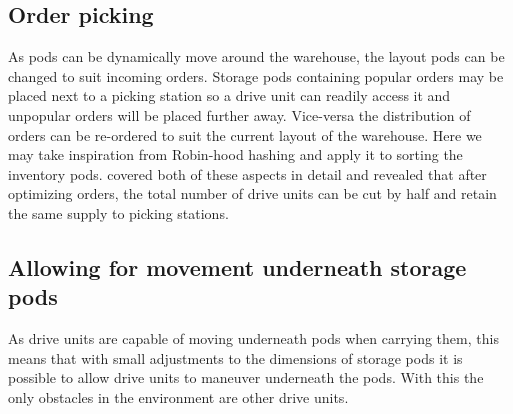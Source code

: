 \documentclass[a4paper,11pt]{article}
\begin{document}
\subsection{Order picking}
As pods can be dynamically move around the warehouse, the layout pods can be changed to suit incoming orders. Storage pods containing popular orders may be placed next to a picking station so a drive unit can readily access it and unpopular orders will be placed further away. Vice-versa the distribution of orders can be re-ordered to suit the current layout of the warehouse. Here we may take inspiration from Robin-hood hashing and apply it to sorting the inventory pods. \cite{boysen2017parts} covered both of these aspects in detail and revealed that after optimizing orders, the total number of drive units can be cut by half and retain the same supply to picking stations.


\subsection{Allowing for movement underneath storage pods}
As drive units are capable of moving underneath pods when carrying them, this means that with small adjustments to the dimensions of storage pods it is possible to allow drive units to maneuver underneath the pods. With this the only obstacles in the environment are other drive units.
\end{document}
